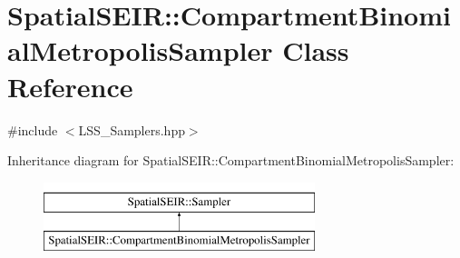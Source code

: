 \hypertarget{classSpatialSEIR_1_1CompartmentBinomialMetropolisSampler}{\section{Spatial\-S\-E\-I\-R\-:\-:Compartment\-Binomial\-Metropolis\-Sampler Class Reference}
\label{classSpatialSEIR_1_1CompartmentBinomialMetropolisSampler}
}


{\ttfamily \#include $<$L\-S\-S\-\_\-\-Samplers.\-hpp$>$}

Inheritance diagram for Spatial\-S\-E\-I\-R\-:\-:Compartment\-Binomial\-Metropolis\-Sampler\-:\begin{figure}[H]
\begin{center}
\leavevmode
\includegraphics[height=2.000000cm]{classSpatialSEIR_1_1CompartmentBinomialMetropolisSampler}
\end{center}
\end{figure}
